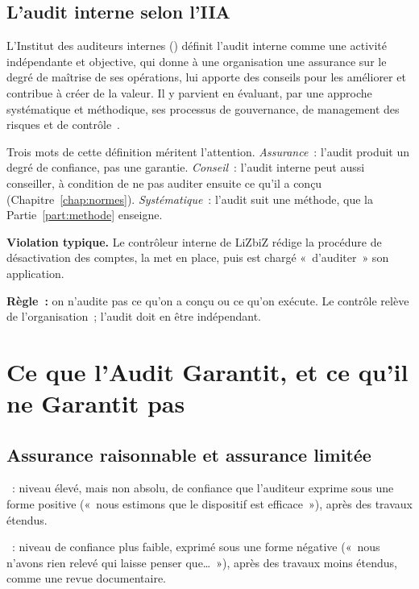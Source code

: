 \subsection{L'audit interne selon l'IIA}

L'Institut des auditeurs internes () définit l'audit interne
comme une activité indépendante et objective, qui donne à une organisation
une assurance sur le degré de maîtrise de ses opérations, lui apporte des
conseils pour les améliorer et contribue à créer de la valeur. Il y parvient
en évaluant, par une approche systématique et méthodique, ses processus de
gouvernance, de management des risques et de contrôle~\cite{iia2017cripp}.

Trois mots de cette définition méritent l'attention. \emph{Assurance}~:
l'audit produit un degré de confiance, pas une garantie. \emph{Conseil}~:
l'audit interne peut aussi conseiller, à condition de ne pas auditer ensuite
ce qu'il a conçu (Chapitre~\ref{chap:normes}). \emph{Systématique}~:
l'audit suit une méthode, que la Partie~\ref{part:methode} enseigne.

\begin{boxalert}
\textbf{Violation typique.} Le contrôleur interne de LiZbiZ rédige la
procédure de désactivation des comptes, la met en place, puis est chargé
«~d'auditer~» son application.

\smallskip
\textbf{Règle~:} on n'audite pas ce qu'on a conçu ou ce qu'on exécute. Le
contrôle relève de l'organisation~; l'audit doit en être indépendant.
\end{boxalert}

\section{Ce que l'Audit Garantit, et ce qu'il ne Garantit pas}
\label{sec:c01-assurance}

\subsection{Assurance raisonnable et assurance limitée}

\begin{boxdef}
~: niveau élevé,
mais non absolu, de confiance que l'auditeur exprime sous une forme
positive («~nous estimons que le dispositif est efficace~»), après des
travaux étendus.

\medskip
{}~: niveau de confiance
plus faible, exprimé sous une forme négative («~nous n'avons rien relevé
qui laisse penser que\ldots~»), après des travaux moins étendus, comme une
revue documentaire.
\end{boxdef}


